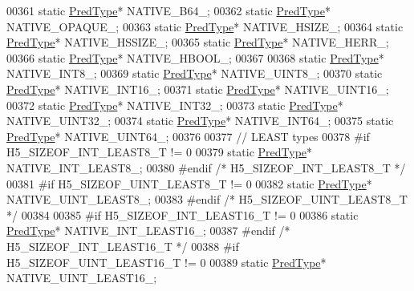 \begin{DoxyCode}
00361         \textcolor{keyword}{static} \hyperlink{class_h5_1_1_pred_type}{PredType}* NATIVE\_B64\_;
00362         \textcolor{keyword}{static} \hyperlink{class_h5_1_1_pred_type}{PredType}* NATIVE\_OPAQUE\_;
00363         \textcolor{keyword}{static} \hyperlink{class_h5_1_1_pred_type}{PredType}* NATIVE\_HSIZE\_;
00364         \textcolor{keyword}{static} \hyperlink{class_h5_1_1_pred_type}{PredType}* NATIVE\_HSSIZE\_;
00365         \textcolor{keyword}{static} \hyperlink{class_h5_1_1_pred_type}{PredType}* NATIVE\_HERR\_;
00366         \textcolor{keyword}{static} \hyperlink{class_h5_1_1_pred_type}{PredType}* NATIVE\_HBOOL\_;
00367 
00368         \textcolor{keyword}{static} \hyperlink{class_h5_1_1_pred_type}{PredType}* NATIVE\_INT8\_;
00369         \textcolor{keyword}{static} \hyperlink{class_h5_1_1_pred_type}{PredType}* NATIVE\_UINT8\_;
00370         \textcolor{keyword}{static} \hyperlink{class_h5_1_1_pred_type}{PredType}* NATIVE\_INT16\_;
00371         \textcolor{keyword}{static} \hyperlink{class_h5_1_1_pred_type}{PredType}* NATIVE\_UINT16\_;
00372         \textcolor{keyword}{static} \hyperlink{class_h5_1_1_pred_type}{PredType}* NATIVE\_INT32\_;
00373         \textcolor{keyword}{static} \hyperlink{class_h5_1_1_pred_type}{PredType}* NATIVE\_UINT32\_;
00374         \textcolor{keyword}{static} \hyperlink{class_h5_1_1_pred_type}{PredType}* NATIVE\_INT64\_;
00375         \textcolor{keyword}{static} \hyperlink{class_h5_1_1_pred_type}{PredType}* NATIVE\_UINT64\_;
00376 
00377 \textcolor{comment}{// LEAST types}
00378 \textcolor{preprocessor}{#if H5\_SIZEOF\_INT\_LEAST8\_T != 0}
00379         \textcolor{keyword}{static} \hyperlink{class_h5_1_1_pred_type}{PredType}* NATIVE\_INT\_LEAST8\_;
00380 \textcolor{preprocessor}{#endif }\textcolor{comment}{/* H5\_SIZEOF\_INT\_LEAST8\_T */}\textcolor{preprocessor}{}
00381 \textcolor{preprocessor}{#if H5\_SIZEOF\_UINT\_LEAST8\_T != 0}
00382         \textcolor{keyword}{static} \hyperlink{class_h5_1_1_pred_type}{PredType}* NATIVE\_UINT\_LEAST8\_;
00383 \textcolor{preprocessor}{#endif }\textcolor{comment}{/* H5\_SIZEOF\_UINT\_LEAST8\_T */}\textcolor{preprocessor}{}
00384 
00385 \textcolor{preprocessor}{#if H5\_SIZEOF\_INT\_LEAST16\_T != 0}
00386         \textcolor{keyword}{static} \hyperlink{class_h5_1_1_pred_type}{PredType}* NATIVE\_INT\_LEAST16\_;
00387 \textcolor{preprocessor}{#endif }\textcolor{comment}{/* H5\_SIZEOF\_INT\_LEAST16\_T */}\textcolor{preprocessor}{}
00388 \textcolor{preprocessor}{#if H5\_SIZEOF\_UINT\_LEAST16\_T != 0}
00389         \textcolor{keyword}{static} \hyperlink{class_h5_1_1_pred_type}{PredType}* NATIVE\_UINT\_LEAST16\_;

\end{DoxyCode}
